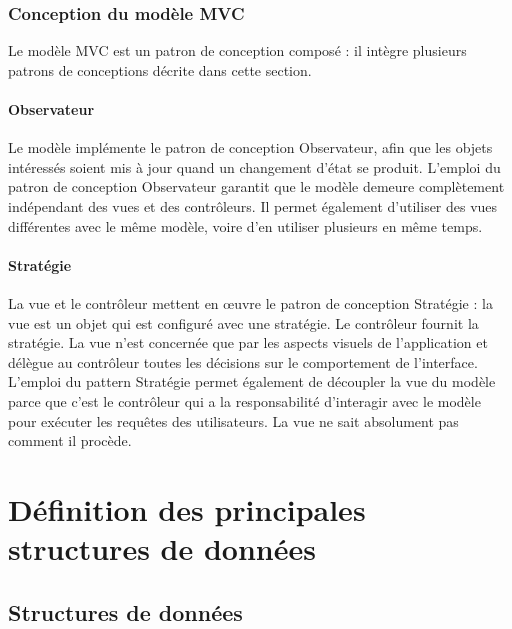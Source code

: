 \documentclass[10pt,a4paper]{report}
\begin{document}
			
		\subsubsection{Conception du modèle MVC}
		
		Le modèle MVC est un patron de conception composé : il intègre plusieurs patrons de conceptions décrite dans cette section.
		
		\paragraph{Observateur}
		\begin{flushleft}
				Le modèle implémente le patron de conception Observateur, afin que les objets intéressés soient mis à jour quand un changement d’état se produit. L’emploi du patron de conception Observateur garantit que le modèle demeure complètement indépendant des vues et des contrôleurs. Il permet également d’utiliser des vues différentes avec le même modèle, voire d’en utiliser plusieurs en même temps.

		\end{flushleft}
		\paragraph{Stratégie}
		\begin{flushleft}
		La vue et le contrôleur mettent en œuvre le patron de conception Stratégie : la vue est un objet qui est configuré avec une stratégie. Le contrôleur fournit la stratégie. La vue n’est concernée que par les aspects visuels de l’application et délègue au contrôleur toutes les décisions sur le  comportement de l’interface. L’emploi du pattern Stratégie permet également de découpler la vue du modèle parce que c’est le contrôleur qui a la responsabilité d’interagir avec le modèle pour exécuter les requêtes des utilisateurs. La vue ne sait absolument pas comment il procède.		
		\end{flushleft}



\section{Définition des principales structures de données}

	\subsection{Structures de données}
\end{document}
